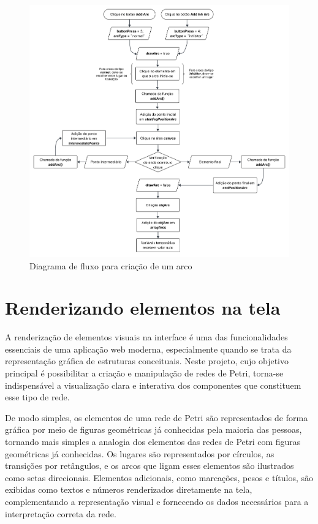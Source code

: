 \documentclass[
	12pt,				%
	openright,			%
	oneside,			%
	a4paper,			%
	english,			%
	brazil				%
	]{abntex2}
\theoremstyle{doispontos}
\begin{document}
\begin{figure}[ht] 
	\centering
	\includegraphics[scale=0.12]{figuras/diagrama-fluxo-addArc.png}
	\caption[Diagrama de fluxo para criação de um Arco]{Diagrama de fluxo para criação de um arco}
	\label{fig:addArcDiagram}
\end{figure}
\FloatBarrier

\section{Renderizando elementos na tela}

A renderização de elementos visuais na interface é uma das funcionalidades essenciais de uma aplicação web moderna, especialmente quando se trata da representação gráfica de estruturas conceituais. Neste projeto, cujo objetivo principal é possibilitar a criação e manipulação de redes de Petri, torna-se indispensável a visualização clara e interativa dos componentes que constituem esse tipo de rede.

De modo simples, os elementos de uma rede de Petri são representados de forma gráfica por meio de figuras geométricas já conhecidas pela maioria das pessoas, tornando mais simples a analogia dos elementos das redes de Petri com figuras geométricas já conhecidas. Os lugares são representados por círculos, as transições por retângulos, e os arcos que ligam esses elementos são ilustrados como setas direcionais. Elementos adicionais, como marcações, pesos e títulos, são exibidas como textos e números renderizados diretamente na tela, complementando a representação visual e fornecendo os dados necessários para a interpretação correta da rede.
\end{document}
